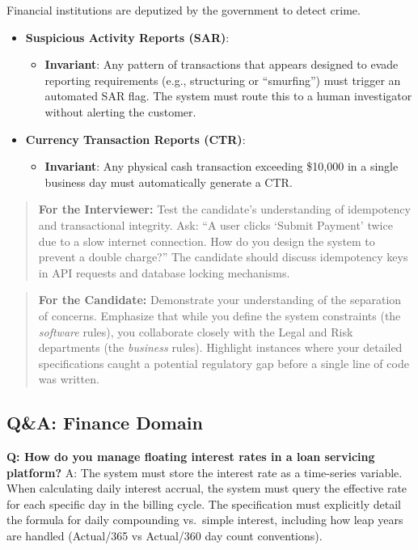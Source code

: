 Financial institutions are deputized by the government to detect crime.

\begin{itemize}
\tightlist
\item
  \textbf{Suspicious Activity Reports (SAR)}:

  \begin{itemize}
  \tightlist
  \item
    \textbf{Invariant}: Any pattern of transactions that appears
    designed to evade reporting requirements (e.g., structuring or
    ``smurfing'') must trigger an automated SAR flag. The system must
    route this to a human investigator without alerting the customer.
  \end{itemize}
\item
  \textbf{Currency Transaction Reports (CTR)}:

  \begin{itemize}
  \tightlist
  \item
    \textbf{Invariant}: Any physical cash transaction exceeding \$10,000
    in a single business day must automatically generate a CTR.
  \end{itemize}
\end{itemize}

\begin{quote}
\textbf{For the Interviewer:} Test the candidate's understanding of
idempotency and transactional integrity. Ask: ``A user clicks `Submit
Payment' twice due to a slow internet connection. How do you design the
system to prevent a double charge?'' The candidate should discuss
idempotency keys in API requests and database locking mechanisms.
\end{quote}

\begin{quote}
\textbf{For the Candidate:} Demonstrate your understanding of the
separation of concerns. Emphasize that while you define the system
constraints (the \emph{software} rules), you collaborate closely with
the Legal and Risk departments (the \emph{business} rules). Highlight
instances where your detailed specifications caught a potential
regulatory gap before a single line of code was written.
\end{quote}

\subsection{Q\&A: Finance Domain}\label{qa-finance-domain}

\textbf{Q: How do you manage floating interest rates in a loan servicing
platform?} A: The system must store the interest rate as a time-series
variable. When calculating daily interest accrual, the system must query
the effective rate for each specific day in the billing cycle. The
specification must explicitly detail the formula for daily compounding
vs.~simple interest, including how leap years are handled (Actual/365 vs
Actual/360 day count conventions).

